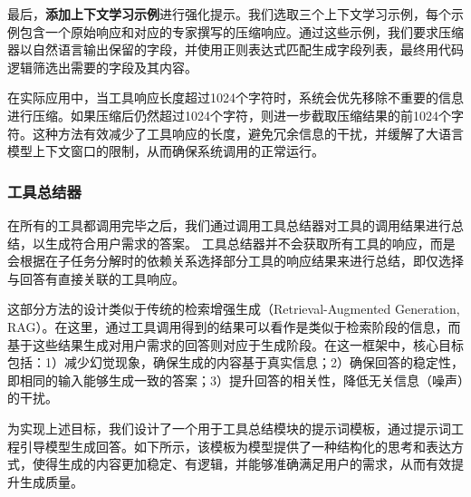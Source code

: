 最后，\textbf{添加上下文学习示例}进行强化提示。我们选取三个上下文学习示例，每个示例包含一个原始响应和对应的专家撰写的压缩响应。通过这些示例，我们要求压缩器以自然语言输出保留的字段，并使用正则表达式匹配生成字段列表，最终用代码逻辑筛选出需要的字段及其内容。

在实际应用中，当工具响应长度超过1024个字符时，系统会优先移除不重要的信息进行压缩。如果压缩后仍然超过1024个字符，则进一步截取压缩结果的前1024个字符。这种方法有效减少了工具响应的长度，避免冗余信息的干扰，并缓解了大语言模型上下文窗口的限制，从而确保系统调用的正常运行。


\subsubsection{工具总结器}

在所有的工具都调用完毕之后，我们通过调用工具总结器对工具的调用结果进行总结，以生成符合用户需求的答案。
工具总结器并不会获取所有工具的响应，而是会根据在子任务分解时的依赖关系选择部分工具的响应结果来进行总结，即仅选择与回答有直接关联的工具响应。


这部分方法的设计类似于传统的检索增强生成（Retrieval-Augmented Generation, RAG）。在这里，通过工具调用得到的结果可以看作是类似于检索阶段的信息，而基于这些结果生成对用户需求的回答则对应于生成阶段。在这一框架中，核心目标包括：1）减少幻觉现象，确保生成的内容基于真实信息；2）确保回答的稳定性，即相同的输入能够生成一致的答案；3）提升回答的相关性，降低无关信息（噪声）的干扰。

为实现上述目标，我们设计了一个用于工具总结模块的提示词模板，通过提示词工程引导模型生成回答。如下所示，该模板为模型提供了一种结构化的思考和表达方式，使得生成的内容更加稳定、有逻辑，并能够准确满足用户的需求，从而有效提升生成质量。


